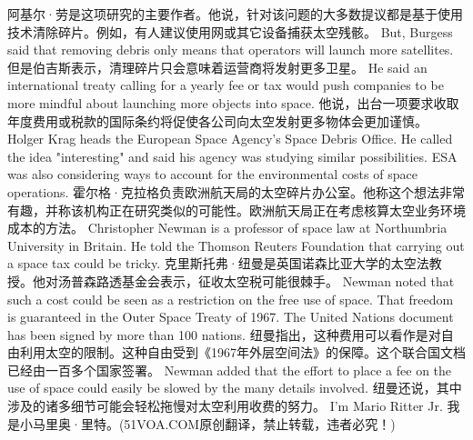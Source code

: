 阿基尔·劳是这项研究的主要作者。他说，针对该问题的大多数提议都是基于使用技术清除碎片。例如，有人建议使用网或其它设备捕获太空残骸。
But, Burgess said that removing debris only means that operators will launch more satellites.
但是伯吉斯表示，清理碎片只会意味着运营商将发射更多卫星。
He said an international treaty calling for a yearly fee or tax would push companies to be more mindful about launching more objects into space.
他说，出台一项要求收取年度费用或税款的国际条约将促使各公司向太空发射更多物体会更加谨慎。
Holger Krag heads the European Space Agency's Space Debris Office. He called the idea "interesting" and said his agency was studying similar possibilities. ESA was also considering ways to account for the environmental costs of space operations.
霍尔格·克拉格负责欧洲航天局的太空碎片办公室。他称这个想法非常有趣，并称该机构正在研究类似的可能性。欧洲航天局正在考虑核算太空业务环境成本的方法。
Christopher Newman is a professor of space law at Northumbria University in Britain. He told the Thomson Reuters Foundation that carrying out a space tax could be tricky.
克里斯托弗·纽曼是英国诺森比亚大学的太空法教授。他对汤普森路透基金会表示，征收太空税可能很棘手。
Newman noted that such a cost could be seen as a restriction on the free use of space. That freedom is guaranteed in the Outer Space Treaty of 1967. The United Nations document has been signed by more than 100 nations.
纽曼指出，这种费用可以看作是对自由利用太空的限制。这种自由受到《1967年外层空间法》的保障。这个联合国文档已经由一百多个国家签署。
Newman added that the effort to place a fee on the use of space could easily be slowed by the many details involved.
纽曼还说，其中涉及的诸多细节可能会轻松拖慢对太空利用收费的努力。
I'm Mario Ritter Jr.
我是小马里奥·里特。(51VOA.COM原创翻译，禁止转载，违者必究！)
